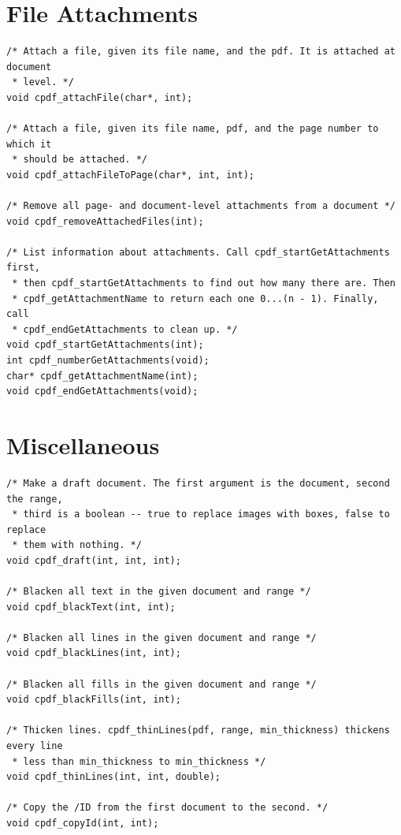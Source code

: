 \documentclass[a4paper]{memoir}
\begin{document}
\chapter{File Attachments}
\begin{small}
\begin{lstlisting}
/* Attach a file, given its file name, and the pdf. It is attached at document
 * level. */
void cpdf_attachFile(char*, int);

/* Attach a file, given its file name, pdf, and the page number to which it
 * should be attached. */
void cpdf_attachFileToPage(char*, int, int);

/* Remove all page- and document-level attachments from a document */
void cpdf_removeAttachedFiles(int);

/* List information about attachments. Call cpdf_startGetAttachments first,
 * then cpdf_startGetAttachments to find out how many there are. Then
 * cpdf_getAttachmentName to return each one 0...(n - 1). Finally, call
 * cpdf_endGetAttachments to clean up. */
void cpdf_startGetAttachments(int);
int cpdf_numberGetAttachments(void);
char* cpdf_getAttachmentName(int);
void cpdf_endGetAttachments(void);

\end{lstlisting}
\end{small}

\chapter{Miscellaneous}
\begin{small}
\begin{lstlisting}
/* Make a draft document. The first argument is the document, second the range,
 * third is a boolean -- true to replace images with boxes, false to replace
 * them with nothing. */
void cpdf_draft(int, int, int);

/* Blacken all text in the given document and range */
void cpdf_blackText(int, int);

/* Blacken all lines in the given document and range */
void cpdf_blackLines(int, int);

/* Blacken all fills in the given document and range */
void cpdf_blackFills(int, int);

/* Thicken lines. cpdf_thinLines(pdf, range, min_thickness) thickens every line
 * less than min_thickness to min_thickness */
void cpdf_thinLines(int, int, double);

/* Copy the /ID from the first document to the second. */
void cpdf_copyId(int, int);
\end{lstlisting}
\end{small}
\end{document}
